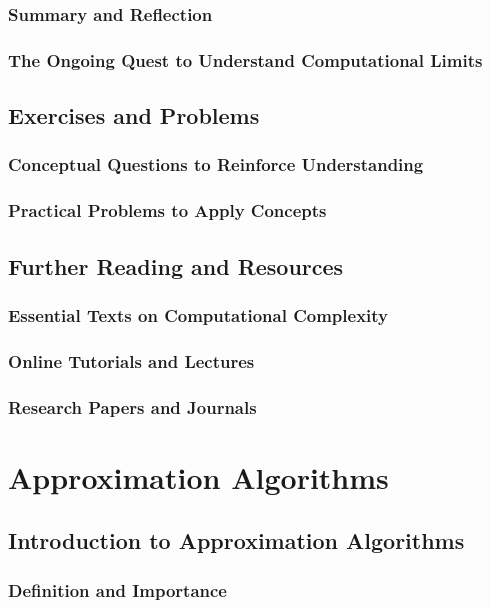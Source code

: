 \documentclass[12pt]{book} %
\begin{document}
\subsection{Summary and Reflection}
\subsection{The Ongoing Quest to Understand Computational Limits}

\section{Exercises and Problems}
\subsection{Conceptual Questions to Reinforce Understanding}
\subsection{Practical Problems to Apply Concepts}

\section{Further Reading and Resources}
\subsection{Essential Texts on Computational Complexity}
\subsection{Online Tutorials and Lectures}
\subsection{Research Papers and Journals}



\chapter{Approximation Algorithms}

\section{Introduction to Approximation Algorithms}
\subsection{Definition and Importance}
\end{document}

